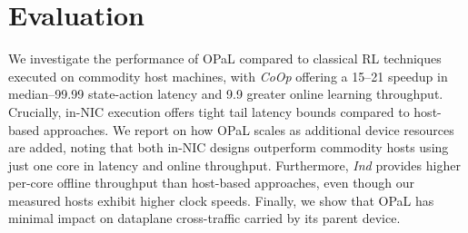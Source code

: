 \documentclass[
conference
,10pt
]{IEEEtran}
\newcommand{\approachshort}{OPaL}
\newcommand{\Coopfw}{\emph{CoOp}}
\newcommand{\Indfw}{\emph{Ind}}
\begin{document}
%

\section{Evaluation}\label{sec:evaluation}
We investigate the performance of \approachshort{} compared to classical RL techniques executed on commodity host machines, with \Coopfw{} offering a \SIrange{15}{21}{\texttimes} speedup in median--\num{99.99} state-action latency and \SI{9.9}{\texttimes} greater online learning throughput.
Crucially, in-NIC execution offers tight tail latency bounds compared to host-based approaches.
We report on how \approachshort{} scales as additional device resources are added, noting that both in-NIC designs outperform commodity hosts using just one core in latency and online throughput.
Furthermore, \Indfw{} provides higher per-core offline throughput than host-based approaches, even though our measured hosts exhibit higher clock speeds.
Finally, we show that \approachshort{} has minimal impact on dataplane cross-traffic carried by its parent device.
\end{document}
